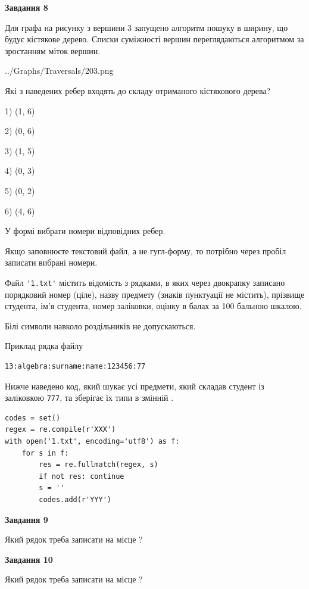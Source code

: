 \documentclass[12pt, ukrainian]{article}
\def\code#1{\Verb!#1!}
\begin{document}
{\begin {large}
{\begin {center}\textbf{Завдання 8}\end {center}}\par
Для графа на рисунку з вершини 3 запущено алгоритм пошуку в ширину, що будує кістякове дерево. Списки суміжності вершин переглядаються алгоритмом за зростанням міток вершин.\par
\begin{center}
	{../Graphs/Traversals/203.png}
\end{center}
\par Які з наведених ребер входять до складу отриманого кістякового дерева?\par
1) (1, 6)\par
2) (0, 6)\par
3) (1, 5)\par
4) (0, 3)\par
5) (0, 2)\par
6) (4, 6)\par
{\vskip 15pt} У формі вибрати номери відповідних ребер.


Якщо заповнюєте текстовий файл, а не гугл-форму, то потрібно через пробіл записа\-ти вибрані номери.\par
\newpage


Файл \code{'1.txt'} містить відомість з рядками, в яких через двокрапку записано поряд\-ковий номер (ціле), назву предмету (знаків пунктуації не містить), прізвище студента, ім'я студента, номер заліковки, оцінку в балах за 100 бальною шкалою.

Білі символи навколо роздільників не допускаються.

Приклад рядка файлу



\begin{verbatim}
13:algebra:surname:name:123456:77
\end{verbatim}


Нижче наведено код, який шукає усі предмети, який складав студент із заліковкою \code{777}, та зберігає їх типи в змінній .



\begin{verbatim}
codes = set()
regex = re.compile(r'XXX')
with open('1.txt', encoding='utf8') as f:
    for s in f:
        res = re.fullmatch(regex, s)
        if not res: continue
        s = ''
        codes.add(r'YYY')
\end{verbatim}


{\begin {center}\textbf{Завдання 9}\end {center}}\par
Який рядок треба записати на місце  ?\par
\vspace{5mm}


{\begin {center}\textbf{Завдання 10}\end {center}}\par
Який рядок треба записати на місце  ?\par


\newpage


\end {large}}
\end{document}
